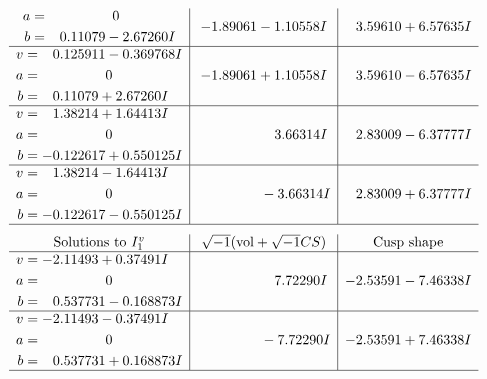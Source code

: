 \documentclass[1p]{elsarticle_modified}
\theoremstyle{definition}
\newcommand{\I}{\sqrt{-1}}
\begin{document}
$$\begin{array}{c|c|c}
\begin{aligned}
a &= \phantom{-0.000000 } 0 \\
b &= \phantom{-}0.11079 - 2.67260 I\end{aligned}
 & -1.89061 - 1.10558 I & \phantom{-}3.59610 + 6.57635 I \\ \hline\begin{aligned}
v &= \phantom{-}0.125911 - 0.369768 I \\
a &= \phantom{-0.000000 } 0 \\
b &= \phantom{-}0.11079 + 2.67260 I\end{aligned}
 & -1.89061 + 1.10558 I & \phantom{-}3.59610 - 6.57635 I \\ \hline\begin{aligned}
v &= \phantom{-}1.38214 + 1.64413 I \\
a &= \phantom{-0.000000 } 0 \\
b &= -0.122617 + 0.550125 I\end{aligned}
 & \phantom{-0.000000 -}3.66314 I & \phantom{-}2.83009 - 6.37777 I \\ \hline\begin{aligned}
v &= \phantom{-}1.38214 - 1.64413 I \\
a &= \phantom{-0.000000 } 0 \\
b &= -0.122617 - 0.550125 I\end{aligned}
 & \phantom{-0.000000 } -3.66314 I & \phantom{-}2.83009 + 6.37777 I\\
 \hline 
 \end{array}$$\newpage$$\begin{array}{c|c|c}  
\text{Solutions to }I^v_{1}& \I (\text{vol} + \sqrt{-1}CS) & \text{Cusp shape}\\
 \hline 
\begin{aligned}
v &= -2.11493 + 0.37491 I \\
a &= \phantom{-0.000000 } 0 \\
b &= \phantom{-}0.537731 - 0.168873 I\end{aligned}
 & \phantom{-0.000000 -}7.72290 I & -2.53591 - 7.46338 I \\ \hline\begin{aligned}
v &= -2.11493 - 0.37491 I \\
a &= \phantom{-0.000000 } 0 \\
b &= \phantom{-}0.537731 + 0.168873 I\end{aligned}
 & \phantom{-0.000000 } -7.72290 I & -2.53591 + 7.46338 I\\
 \hline 
 \end{array}$$\newpage
\newpage\renewcommand{\arraystretch}{1}
\end{document}
